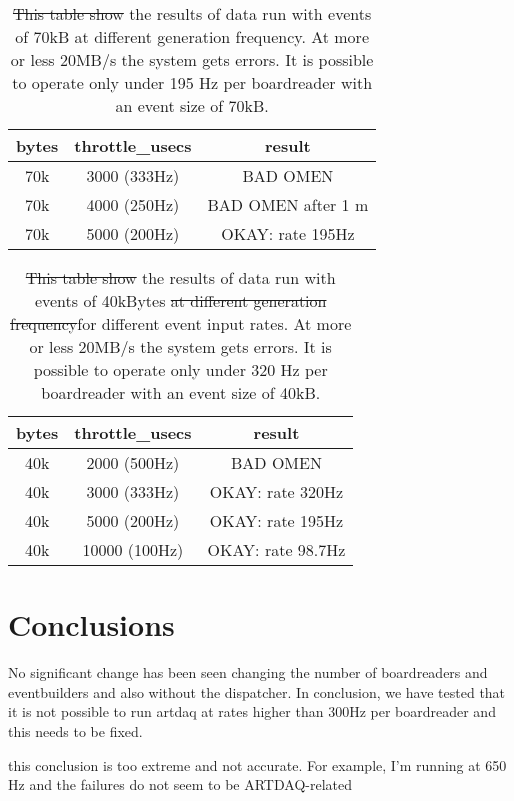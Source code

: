 \documentclass[12pt]{article}
\newcommand {\add}[1]    {{\red #1}}
\newcommand {\del}[1]    {{\blue \sout{#1}}}
\newcommand {\red}       {\color{red}}
\newcommand {\blue}      {\color{blue}}
\begin{document}
\begin{center}  
\begin{table}[!h]
\centering
\begin{tabular}{c c c}
\hline
bytes & throttle\_usecs &  result\\
\hline
70k & 3000 (333Hz) & BAD OMEN  \\

70k & 4000 (250Hz) & BAD OMEN after 1 m  \\

70k & 5000 (200Hz) & OKAY: rate 195Hz  \\
\end{tabular}
\caption{
  \del{This table show} the results of data run with events of 70kB at different generation frequency.
  At more or less 20MB/s the system gets errors. It is possible to operate only
  under 195 Hz per boardreader with an event size of 70kB.
}
\end{table}\label{tab:upperlimits}
\end{center}

\begin{center}  
\begin{table}[!h]
\centering
\begin{tabular}{c c c}
\hline
bytes & throttle\_usecs &  result\\
\hline
40k & 2000 (500Hz) & BAD OMEN  \\
40k & 3000 (333Hz) & OKAY: rate 320Hz  \\
40k & 5000 (200Hz) & OKAY: rate 195Hz  \\
40k & 10000 (100Hz) & OKAY: rate 98.7Hz \\
\end{tabular}
\caption{\del{This table show} the results of data run with events of 40kBytes
  \del{at different generation frequency}\add{for different event input rates}.
  At more or less 20MB/s the system gets errors.
  It is possible to operate only under 320 Hz per boardreader with an event size of 40kB.
}
\end{table}\label{tab:upperlimits}
\end{center}
\section{Conclusions}
No significant change has been seen changing the number of boardreaders
and eventbuilders and also without the dispatcher.
In conclusion, we have tested that it is not possible to run artdaq
at rates higher than 300Hz per boardreader and this needs to be fixed.

\add{
  this conclusion is too extreme and not accurate. For example, I'm running at 650 Hz
  and the failures do not seem to be ARTDAQ-related
}
\end{document}
